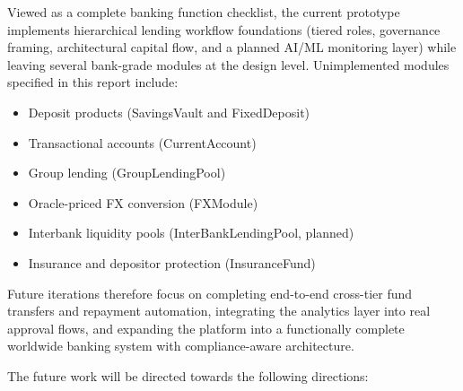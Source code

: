 \documentclass[12pt,a4paper]{report}
\begin{document}
Viewed as a complete banking function checklist, the current prototype implements hierarchical lending workflow foundations (tiered roles, governance framing, architectural capital flow, and a planned AI/ML monitoring layer) while leaving several bank-grade modules at the design level. Unimplemented modules specified in this report include:
\begin{itemize}[noitemsep]
\item Deposit products (SavingsVault and FixedDeposit)
\item Transactional accounts (CurrentAccount)
\item Group lending (GroupLendingPool)
\item Oracle-priced FX conversion (FXModule)
\item Interbank liquidity pools (InterBankLendingPool, planned)
\item Insurance and depositor protection (InsuranceFund)
\end{itemize}
Future iterations therefore focus on completing end-to-end cross-tier fund transfers and repayment automation, integrating the analytics layer into real approval flows, and expanding the platform into a functionally complete worldwide banking system with compliance-aware architecture.

The future work will be directed towards the following directions:
\end{document}

